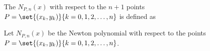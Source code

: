 \begin{definition}
\label{def:Nn(x)}
The  $N_{P,n}(x)$ with respect to the $n+1$ points
$P=\set{(x_k,y_k)}{k=0,1,2,\ldots,n}$ is defined as
\end{definition}


\begin{proposition}
Let $N_{P,n}(x)$ be the Newton polynomial with respect to the points\\
$P=\set{(x_k,y_k)}{k=0,1,2,\ldots,n}$.
\end{proposition}


